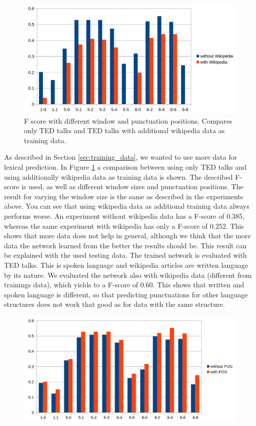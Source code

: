 \begin{figure}[ht]
    \centering
    \includegraphics[width=\textwidth]{img/window_wiki_eval.png}
    \caption{F score with different window and punctuation positions. Compares only TED talks and TED talks with additional wikipedia data as training data.}
    \label{fig:window_wiki_eval}
\end{figure}

As described in Section \ref{sec:training_data}, we wanted to use more data for lexical prediction.
In Figure \ref{fig:window_wiki_eval} a comparison between using only TED talks and using additionally wikipedia data as training data is shown.
The described F-score is used, as well as different window sizes and punctuation positions. 
The result for varying the window size is the same as described in the experiments above. 
You can see that using wikipedia data as additional training data always performs worse.
An experiment without wikipedia data has a F-score of 0.385, whereas the same experiment with wikipedia has only a F-score of 0.252. 
This shows that more data does not help in general, although we think that the more data the network learned from the better the results should be.
This result can be explained with the used testing data. 
The trained network is evaluated with TED talks.
This is spoken language and wikipedia articles are written language by its nature. 
We evaluated the network also with wikipedia data (different from trainings data), which yields to a F-score of 0.60. 
This shows that written and spoken language is different, so that predicting punctuations for other language structures does not work that good as for data with the same structure.

\begin{figure}[ht]
    \centering
    \includegraphics[width=\textwidth]{img/window_pos_eval.png}
    \caption{}
    \label{fig:window_pos_eval}
\end{figure}

